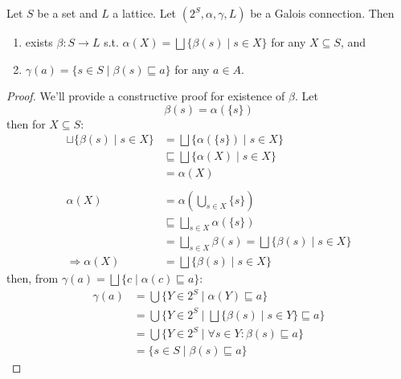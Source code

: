 Let $S$ be a set and $L$ a lattice. Let $(2^S, \alpha, \gamma, L)$ be a Galois connection. Then
\begin{enumerate}
	\item exists $\beta: S \rightarrow L$ s.t. $\alpha(X) = \bigsqcup\{\beta(s) \mid s \in X\}$ for any $X \subseteq S$, and
	\item $\gamma(a) = \{s \in S \mid \beta(s) \sqsubseteq a \}$ for any $a \in A$.
\end{enumerate}
\begin{proof}
We'll provide a constructive proof for existence of $\beta$. Let
\begin{equation*}
\beta(s) = \alpha(\{s\})
\end{equation*}
then for $X \subseteq S$:
\begin{align*}
	\sqcup\{\beta(s) \mid s \in X\} & =  \bigsqcup\{\alpha(\{s\}) \mid s \in X\} \\
    {} & \sqsubseteq \bigsqcup\{ \alpha(X) \mid s \in X \} \\
	{} & = \alpha(X) \\
	\\
	\alpha(X) & =  \alpha\left(\bigcup_{s \in X}\{s\}\right) \\
	{} & \sqsubseteq \bigsqcup_{s \in X} \alpha(\{s\}) \\
	{} & = \bigsqcup_{s \in X} \beta(s) = \bigsqcup\{\beta(s) \mid s \in X\}
	\\
	\Rightarrow \alpha(X) & = \bigsqcup \{ \beta(s) \mid s \in X\}
\end{align*}
then, from $\gamma(a) = \bigsqcup \{ c \mid \alpha(c) \sqsubseteq a\}$:
\begin{align*}
	\gamma(a) & = \bigcup \{ Y \in 2^S \mid \alpha(Y) \sqsubseteq a\} \\
	{} & = \bigcup \{ Y \in 2^S \mid \bigsqcup\{\beta(s) \mid s \in Y\} \sqsubseteq a \} \\
	{} & = \bigcup \{ Y \in 2^S \mid \forall s \in Y: \beta(s) \sqsubseteq a\} \\
	{} & = \{ s \in S \mid \beta(s) \sqsubseteq a\}
\end{align*}
\end{proof}